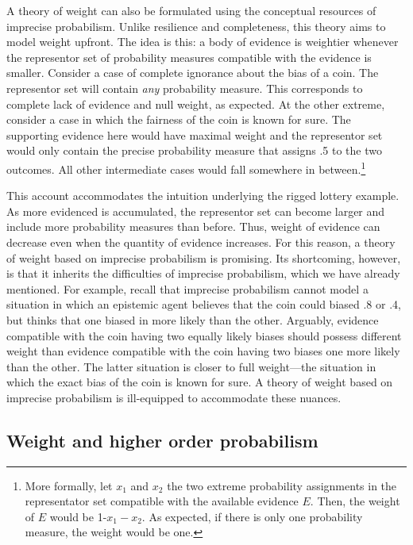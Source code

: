 \documentclass[
  10pt,
  dvipsnames,enabledeprecatedfontcommands]{scrartcl}
\begin{document}
A theory of weight can also be formulated using the conceptual resources
of imprecise probabilism. Unlike resilience and completeness, this
theory aims to model weight upfront.
 The idea is
this: a body of evidence is weightier whenever the representor set of
probability measures compatible with the evidence is smaller. Consider a
case of complete ignorance about the bias of a coin. The representor set
will contain \emph{any} probability measure. This corresponds to
complete lack of evidence and null weight, as expected. At the other
extreme, consider a case in which the fairness of the coin is known for
sure. The supporting evidence here would have maximal weight and the
representor set would only contain the precise probability measure that
assigns .5 to the two outcomes. All other intermediate cases would fall
somewhere in between.\footnote{More formally, let \(x_1\) and \(x_2\)
  the two extreme probability assignments in the representator set
  compatible with the available evidence \(E\). Then, the weight of
  \(E\) would be 1-\(x_1-x_2\). As expected, if there is only one
  probability measure, the weight would be one.}

This account accommodates the intuition underlying the rigged lottery
example. As more evidenced is accumulated, the representor set can
become larger and include more probability measures than before. Thus,
weight of evidence can decrease even when the quantity of evidence
increases. For this reason, a theory of weight based on imprecise
probabilism is promising. Its shortcoming, however, is that it inherits
the difficulties of imprecise probabilism, which we have already
mentioned. For example, recall that imprecise probabilism cannot model a
situation in which an epistemic agent believes that the coin could
biased .8 or .4, but thinks that one biased in more likely than the
other. Arguably, evidence compatible with the coin having two equally
likely biases should possess different weight than evidence compatible
with the coin having two biases one more likely than the other. The
latter situation is closer to full weight---the situation in which the
exact bias of the coin is known for sure. A theory of weight based on
imprecise probabilism is ill-equipped to accommodate these nuances.

\hypertarget{weight-and-higher-order-probabilism}{%
\subsection{Weight and higher order
probabilism}\label{weight-and-higher-order-probabilism}}
\end{document}
